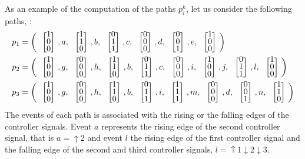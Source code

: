 \setlength\arraycolsep{2pt}
As an example of the computation of the paths $p_i^k$, let us consider the following
paths, \cite{moreira2018enhanced}:
\begin{align*}
  p_1&= \left(\colvec{1\\0\\0},a,\colvec{1\\1\\0},b,\colvec{0\\1\\1},c,\colvec{0\\0\\0},d,\colvec{0\\0\\1},e,\colvec{1\\0\\0}\right) \\
  p_2&= \left(\colvec{1\\0\\0},g,\colvec{0\\0\\0},h,\colvec{1\\1\\0},b,\colvec{0\\1\\1},c,\colvec{0\\0\\0},i,\colvec{1\\0\\0},j,\colvec{0\\1\\1},l,\colvec{1\\0\\0}\right) \\
  p_3&= \left(\colvec{1\\0\\0},g,\colvec{0\\0\\0},h,\colvec{1\\1\\0},b,\colvec{0\\1\\1},i,\colvec{1\\1\\1},m,\colvec{0\\0\\0},d,\colvec{0\\0\\1},n,\colvec{1\\1\\0}\right) \\
\end{align*}
The events of each path is associated with the rising or the falling edges of
the controller signals. Event $a$ represents the rising edge of the second
controller signal, that is $a=\uparrow$2 and event $l$ the rising edge of the first
controller signal and the falling edge of the second
and third controller signals, $l=\uparrow$1$\downarrow$2$\downarrow$3.

